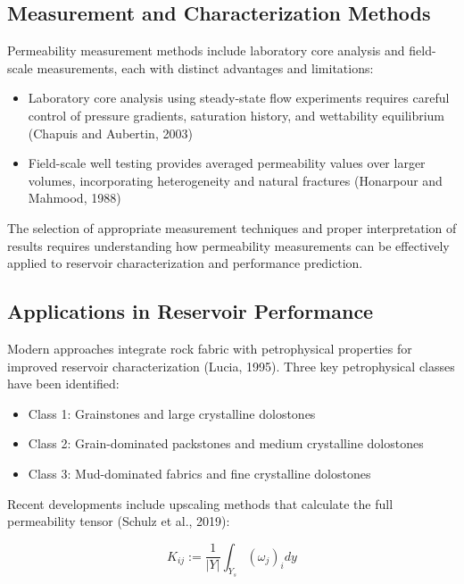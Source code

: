 \documentclass[journal]{IEEEtran}
\begin{document}
\subsection{Measurement and Characterization Methods}

Permeability measurement methods include laboratory core analysis and field-scale measurements, each with distinct advantages and limitations:

\begin{itemize}
    \item Laboratory core analysis using steady-state flow experiments requires careful control of pressure gradients, saturation history, and wettability equilibrium (Chapuis and Aubertin, 2003\parencite{chapuis_use_2003})
    \item Field-scale well testing provides averaged permeability values over larger volumes, incorporating heterogeneity and natural fractures (Honarpour and Mahmood, 1988\parencite{honarpour_relative-permeability_1988})
\end{itemize}

The selection of appropriate measurement techniques and proper interpretation of results requires understanding how permeability measurements can be effectively applied to reservoir characterization and performance prediction.

\subsection{Applications in Reservoir Performance}

Modern approaches integrate rock fabric with petrophysical properties for improved reservoir characterization (Lucia, 1995\parencite{f_jerry_lucia_2_rock-fabricpetrophysical_1995}). Three key petrophysical classes have been identified:

\begin{itemize}
    \item Class 1: Grainstones and large crystalline dolostones
    \item Class 2: Grain-dominated packstones and medium crystalline dolostones
    \item Class 3: Mud-dominated fabrics and fine crystalline dolostones
\end{itemize}

Recent developments include upscaling methods that calculate the full permeability tensor (Schulz et al., 2019\parencite{schulz_beyond_2019}):

\begin{equation}
K_{ij} := \frac{1}{|Y|}\int_{Y_s}(\omega_j)_i dy
\end{equation}
\end{document}
